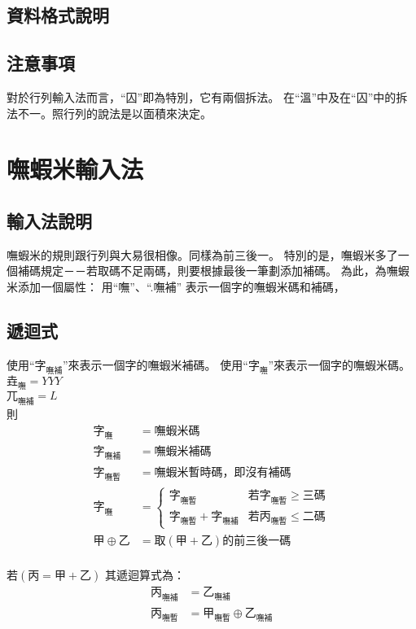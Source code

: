 \documentclass{article}
\newcommand\qhchar[1]{\mbox{#1}}
\newcommand\qhbs[1]{\qhchar{#1}_{\mbox{嘸}}}
\newcommand\qhbscomp[1]{\qhchar{#1}_{\mbox{嘸補}}}
\newcommand\qhbstemp[1]{\qhchar{#1}_{\mbox{嘸暫}}}
\begin{document}
\subsection{資料格式說明}
\subsection{注意事項}
對於行列輸入法而言，``囚''即為特別，它有兩個拆法。
在``溫''中及在``囚''中的拆法不一。照行列的說法是以面積來決定。

\section{嘸蝦米輸入法}
\subsection{輸入法說明}
嘸蝦米的規則跟行列與大易很相像。同樣為前三後一。
特別的是，嘸蝦米多了一個補碼規定－－若取碼不足兩碼，則要根據最後一筆劃添加補碼。
為此，為嘸蝦米添加一個屬性：
用``嘸''、``.嘸補'' 表示一個字的嘸蝦米碼和補碼，\\
\subsection{遞迴式}
使用``$\qhbscomp{字}$''來表示一個字的嘸蝦米補碼。
使用``$\qhbs{字}$''來表示一個字的嘸蝦米碼。
$\qhbs{垚}=YYY$\\
$\qhbscomp{兀}=L$\\
則
\begin{subequations}
  \begin{align}
  \qhbs{字} &= 嘸蝦米碼\\
  \qhbscomp{字} &= 嘸蝦米補碼\\
  \qhbstemp{字} &= 嘸蝦米暫時碼，即沒有補碼\\
  \qhbs{字} &=
      \left\{\begin{array}{ll}
        \qhbstemp{字}
           & \text{若$\qhbstemp{字} \geq $三碼}\\
        \qhbstemp{字}+\qhbscomp{字}
           & \text{若$\qhbstemp{丙} \leq $二碼}
      \end{array}\right.\\
  甲 \oplus 乙 &= 取(甲+乙)的前三後一碼\\
  \end{align}
\end{subequations}

若$(\qhchar{丙}=\qhchar{甲}+\qhchar{乙})$
其遞迴算式為：
\begin{subequations}
  \begin{align}
  \qhbscomp{丙}&=\qhbscomp{乙}\\
  \qhbstemp{丙}&=\qhbstemp{甲} \oplus \qhbscomp{乙}\\
  \end{align}
\end{subequations}
\end{document}
